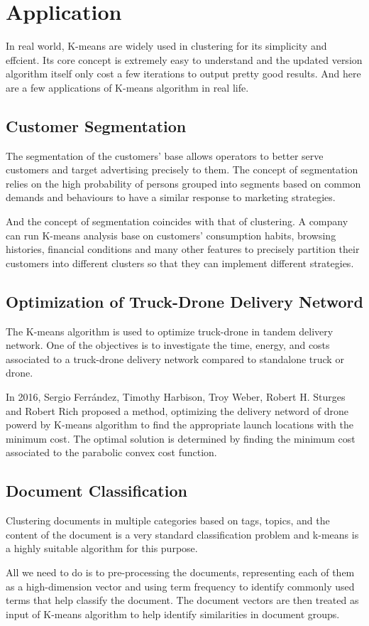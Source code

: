 \documentclass[11pt]{article}
\begin{document}
\section{Application}
In real world, K-means are widely used in clustering for its simplicity and effcient. Its core concept is extremely easy to understand and the updated version algorithm itself only cost a few iterations to output pretty good results. And here are a few applications of K-means algorithm in real life.
\subsection{Customer Segmentation}
The segmentation of the customers' base allows operators to better serve customers and target advertising precisely to them\cite{Bcil2012PrepaidTC}.
The concept of segmentation relies on the high probability of persons grouped into segments based on common demands and behaviours to have a similar response to marketing strategies.
\par And the concept of segmentation coincides with that of clustering. A company can run K-means analysis base on customers' consumption habits, browsing histories, financial conditions and many other features to precisely partition their customers into different clusters so that they can implement different strategies.\cite{Bcil2012PrepaidTC}
\subsection{Optimization of Truck-Drone Delivery Netword}
The K-means algorithm is used to optimize truck-drone in tandem delivery network. One of the objectives is to investigate the time, energy, and costs associated to a truck-drone delivery network compared to standalone truck or drone. 
\par In 2016, Sergio Ferr{\'a}ndez, Timothy Harbison, Troy Weber, Robert H. Sturges and Robert Rich proposed a method\cite{Ferrndez2016OptimizationOA}, optimizing the delivery netword of drone powerd by K-means algorithm to find the appropriate launch locations with the  minimum cost.  The optimal solution is determined by finding the minimum cost associated to the parabolic convex cost function.
\subsection{Document Classification}
Clustering documents in multiple categories based on tags, topics, and the content of the document is a very standard classification problem and k-means is a highly suitable algorithm for this purpose.\cite{kmeansapplication}
\par All we need to do is to pre-processing the documents, representing each of them as a high-dimension vector and using term frequency to identify commonly used terms that help classify the document.
The document vectors are then treated as input of K-means algorithm to help identify similarities in document groups.\cite{Jacob2016ImprovedCO}
\end{document}
